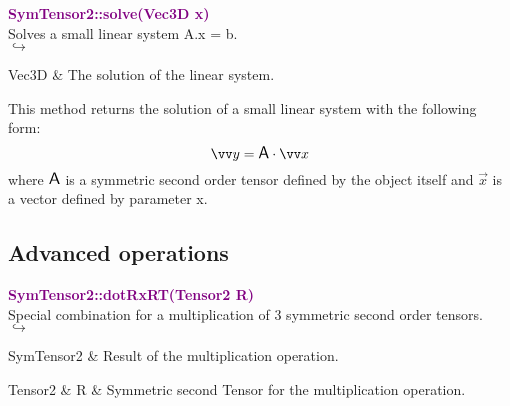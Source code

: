 \textcolor{purple}{\textbf{SymTensor2::solve(Vec3D x)}}\label{SymTensor2::solve(Vec3D x)}\\
Solves a small linear system A.x = b.\\ \hspace*{5mm}$\hookrightarrow$
\vspace*{-2em}\begin{tcolorbox}[grow to left by=-1cm, width=\textwidth-1cm,myArgs,tabularx={l|R}]
Vec3D & The solution of the linear system.
\end{tcolorbox}

This method returns the solution of a small linear system with the following form:
\begin{equation*}
\overrightarrow{y} = \A \cdot \overrightarrow{x}
\end{equation*}
where $\mbox{\large\ensuremath{\mathsf{A}}}$ is a symmetric second order tensor defined by the object itself and $\overrightarrow{x}$ is a vector defined by parameter x.

\subsection{Advanced operations}

\textcolor{purple}{\textbf{SymTensor2::dotRxRT(Tensor2 R)}}\label{SymTensor2::dotRxRT(Tensor2 R)}\\
Special combination for a multiplication of 3 symmetric second order tensors.\\ \hspace*{5mm}$\hookrightarrow$
\vspace*{-2em}\begin{tcolorbox}[grow to left by=-1cm, width=\textwidth-1cm,myArgs,tabularx={l|R}]
SymTensor2 & Result of the multiplication operation.
\end{tcolorbox}

\begin{tcolorbox}[width=\textwidth,myArgs,tabularx={ll|R}]
Tensor2 & R & Symmetric second Tensor for the multiplication operation.
\end{tcolorbox}

